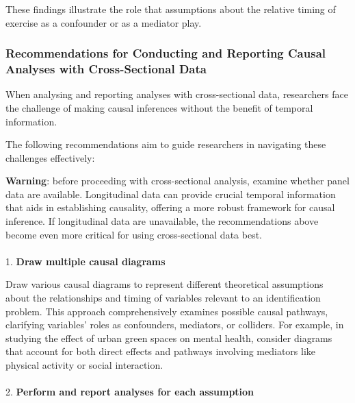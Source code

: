 \documentclass[
  single column]{article}
\makeatletter
\let\oldparagraph\paragraph
\renewcommand{\paragraph}{
    \@ifstar
      \xxxParagraphStar
      \xxxParagraphNoStar
  }
\newcommand{\xxxParagraphStar}[1]{\oldparagraph*{#1}\mbox{}}
\newcommand{\xxxParagraphNoStar}[1]{\oldparagraph{#1}\mbox{}}
\makeatother
\begin{document}
These findings illustrate the role that assumptions about the relative
timing of exercise as a confounder or as a mediator play.

\subsubsection{Recommendations for Conducting and Reporting Causal
Analyses with Cross-Sectional
Data}\label{recommendations-for-conducting-and-reporting-causal-analyses-with-cross-sectional-data}

When analysing and reporting analyses with cross-sectional data,
researchers face the challenge of making causal inferences without the
benefit of temporal information.

The following recommendations aim to guide researchers in navigating
these challenges effectively:

\textbf{Warning}: before proceeding with cross-sectional analysis,
examine whether panel data are available. Longitudinal data can provide
crucial temporal information that aids in establishing causality,
offering a more robust framework for causal inference. If longitudinal
data are unavailable, the recommendations above become even more
critical for using cross-sectional data best.

\paragraph{\texorpdfstring{1. \textbf{Draw multiple causal
diagrams}}{1. Draw multiple causal diagrams}}\label{draw-multiple-causal-diagrams}

Draw various causal diagrams to represent different theoretical
assumptions about the relationships and timing of variables relevant to
an identification problem. This approach comprehensively examines
possible causal pathways, clarifying variables' roles as confounders,
mediators, or colliders. For example, in studying the effect of urban
green spaces on mental health, consider diagrams that account for both
direct effects and pathways involving mediators like physical activity
or social interaction.

\paragraph{\texorpdfstring{2. \textbf{Perform and report analyses for
each
assumption}}{2. Perform and report analyses for each assumption}}\label{perform-and-report-analyses-for-each-assumption}
\end{document}
